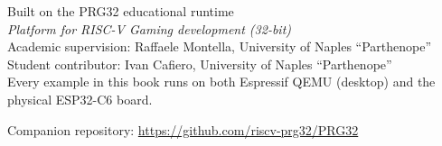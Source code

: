 \begin{titlepage}
\vfill

\begin{flushleft}
{\sffamily\normalsize\color{prgink}
Built on the PRG32 educational runtime\\
\textit{Platform for RISC-V Gaming development (32-bit)}}\\[10pt]
{\small Academic supervision: Raffaele Montella, University of Naples ``Parthenope''\\
Student contributor: Ivan Cafiero, University of Naples ``Parthenope''}\\[10pt]
{\small Every example in this book runs on both Espressif QEMU (desktop) and the physical ESP32-C6 board.}
\end{flushleft}

\vspace{1.2cm}
{\footnotesize\color{prgcomment} Companion repository: \url{https://github.com/riscv-prg32/PRG32}}
\end{titlepage}
